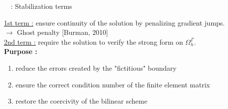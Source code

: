 \begin{frame}{\appendixname~\theappendixframenumber~: Stabilization terms}
	\begin{center}
		\centering
	\end{center}
	\small
	\underline{1st term :} ensure continuity of the solution by penalizing gradient jumps. \\
	$\rightarrow$ Ghost penalty [Burman, 2010] \\
	\underline{2nd term :} require the solution to verify the strong form on $\Omega_h^\Gamma$. \\
	\normalsize
	\textbf{Purpose :} 
	\begin{enumerate}[\ding{217}]
		\item reduce the errors created by the "fictitious" boundary 
		\item ensure the correct condition number of the finite element matrix
		\item restore the coercivity of the bilinear scheme
	\end{enumerate}
\end{frame}
\addtocounter{appendixframenumber}{1}
